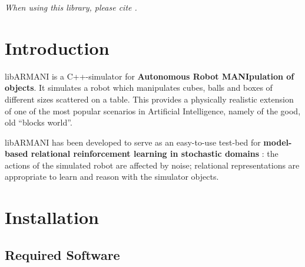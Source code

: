 \documentclass[10pt,twoside,twocolumn,fleqn]{article}
\begin{document}
\maketitle

\begin{center}
\emph{When using this library, please cite \citet{lang-toussaint-10jair}.}
\end{center}

\tableofcontents




\section{Introduction}

libARMANI is a C++-simulator for \textbf{Autonomous Robot MANIpulation
of objects}. It simulates a robot which manipulates cubes, balls and
boxes of different sizes scattered on a table. This provides a
physically realistic extension of one of the most popular scenarios in
Artificial Intelligence, namely of the good, old ``blocks world''.

libARMANI has been developed to serve as an easy-to-use test-bed for
\textbf{model-based relational reinforcement learning in stochastic
domains} \citep{lang-toussaint-10jair}: the actions of the simulated
robot are affected by noise; relational representations are appropriate
to learn and reason with the simulator objects.




\section{Installation}

\subsection{Required Software}
\end{document}

